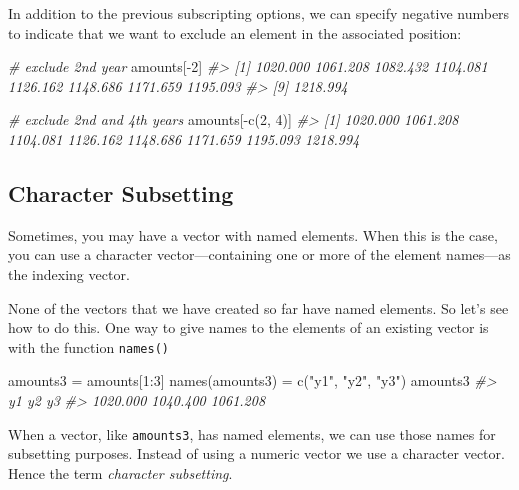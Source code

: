 \documentclass[
]{book}
\newenvironment{Shaded}{\begin{snugshade}}{\end{snugshade}}
\newcommand{\CommentTok}[1]{\textcolor[rgb]{0.56,0.35,0.01}{\textit{#1}}}
\newcommand{\DecValTok}[1]{\textcolor[rgb]{0.00,0.00,0.81}{#1}}
\newcommand{\FunctionTok}[1]{\textcolor[rgb]{0.00,0.00,0.00}{#1}}
\newcommand{\NormalTok}[1]{#1}
\newcommand{\OtherTok}[1]{\textcolor[rgb]{0.56,0.35,0.01}{#1}}
\newcommand{\SpecialCharTok}[1]{\textcolor[rgb]{0.00,0.00,0.00}{#1}}
\newcommand{\StringTok}[1]{\textcolor[rgb]{0.31,0.60,0.02}{#1}}
\begin{document}
In addition to the previous subscripting options, we can specify negative
numbers to indicate that we want to exclude an element in the associated
position:

\begin{Shaded}
\begin{Highlighting}[]
\CommentTok{\# exclude 2nd year}
\NormalTok{amounts[}\SpecialCharTok{{-}}\DecValTok{2}\NormalTok{]}
\CommentTok{\#\textgreater{} [1] 1020.000 1061.208 1082.432 1104.081 1126.162 1148.686 1171.659 1195.093}
\CommentTok{\#\textgreater{} [9] 1218.994}

\CommentTok{\# exclude 2nd and 4th years}
\NormalTok{amounts[}\SpecialCharTok{{-}}\FunctionTok{c}\NormalTok{(}\DecValTok{2}\NormalTok{, }\DecValTok{4}\NormalTok{)]}
\CommentTok{\#\textgreater{} [1] 1020.000 1061.208 1104.081 1126.162 1148.686 1171.659 1195.093 1218.994}
\end{Highlighting}
\end{Shaded}

\hypertarget{character-subsetting}{%
\subsection{Character Subsetting}\label{character-subsetting}}

Sometimes, you may have a vector with named elements. When this is the case,
you can use a character vector---containing one or more of the element names---as
the indexing vector.

None of the vectors that we have created so far have named elements. So let's
see how to do this. One way to give names to the elements of an existing vector
is with the function \texttt{names()}

\begin{Shaded}
\begin{Highlighting}[]
\NormalTok{amounts3 }\OtherTok{=}\NormalTok{ amounts[}\DecValTok{1}\SpecialCharTok{:}\DecValTok{3}\NormalTok{]}
\FunctionTok{names}\NormalTok{(amounts3) }\OtherTok{=} \FunctionTok{c}\NormalTok{(}\StringTok{"y1"}\NormalTok{, }\StringTok{"y2"}\NormalTok{, }\StringTok{"y3"}\NormalTok{)}
\NormalTok{amounts3}
\CommentTok{\#\textgreater{}       y1       y2       y3 }
\CommentTok{\#\textgreater{} 1020.000 1040.400 1061.208}
\end{Highlighting}
\end{Shaded}

When a vector, like \texttt{amounts3}, has named elements, we can use those names for
subsetting purposes. Instead of using a numeric vector we use a character
vector. Hence the term \emph{character subsetting}.
\end{document}
